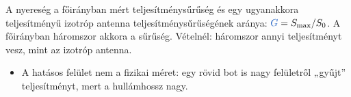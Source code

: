 A nyereség a főirányban mért teljesítménysűrűség és egy ugyanakkora teljesítményű izotróp antenna teljesítménysűrűségének aránya: ${\ca{G}}=S_{\max}/S_0$. A főirányban háromszor akkora a sűrűség. Vételnél: háromszor annyi teljesítményt vesz, mint az izotróp antenna.
\begin{eredmeny}

\begin{center}\end{center}
\end{eredmeny}
\begin{tipp}[Ellenőrzés]
\begin{itemize}
\item A hatásos felület nem a fizikai méret: egy rövid bot is nagy felületről „gyűjt” teljesítményt, mert a hullámhossz nagy.
\end{itemize}
\end{tipp}


